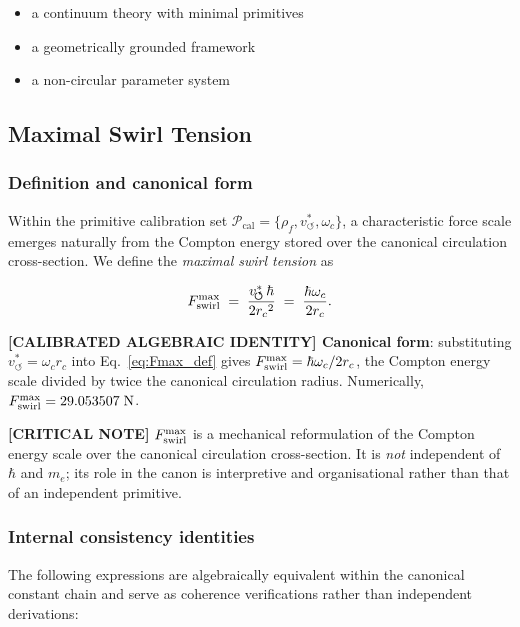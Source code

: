 \documentclass[11pt]{article}
\theoremstyle{definition}
\theoremstyle{plain}
\theoremstyle{remark}
\newcommand{\rhoF}{{\rho_{\!f}}}
\newcommand{\rc}{{r_c}}
\newcommand{\vchar}{v_{\!\boldsymbol{\circlearrowleft}}^{\ast}}
\begin{document}
        \begin{itemize}
            \item a continuum theory with minimal primitives
            \item a geometrically grounded framework
            \item a non-circular parameter system
        \end{itemize}

    \subsection{Maximal Swirl Tension}
    \label{sec:Fmax}

        \subsubsection{Definition and canonical form}

        Within the primitive calibration set $\mathcal{P}_{\mathrm{cal}} = \{\rhoF, \vchar, \omega_c\}$, a characteristic force scale emerges naturally from the Compton energy stored over the canonical circulation cross-section. We define the \emph{maximal swirl tension} as

        \begin{align}
            F_{\rm swirl}^{\max}
            \;=\; \frac{\vchar\,\hbar}{2\rc^2}
            \;=\; \frac{\hbar\omega_c}{2\rc}.
            \label{eq:Fmax_def}
        \end{align}

        \textbf{[CALIBRATED ALGEBRAIC IDENTITY] Canonical form}: substituting $\vchar = \omega_c \rc$ into Eq.~\eqref{eq:Fmax_def} gives $F_{\rm swirl}^{\max} = \hbar\omega_c/2\rc$, the Compton energy scale divided by twice the canonical circulation radius. Numerically, $F_{\rm swirl}^{\max} = 29.053507\;\text{N}$.

        \textbf{[CRITICAL NOTE]} $F_{\rm swirl}^{\max}$ is a mechanical reformulation of the Compton energy scale over the canonical circulation cross-section. It is \emph{not} independent of $\hbar$ and $m_e$; its role in the canon is interpretive and organisational rather than that of an independent primitive.

        \subsubsection{Internal consistency identities}

        The following expressions are algebraically equivalent within the canonical constant chain and serve as coherence verifications rather than independent derivations:
\end{document}
